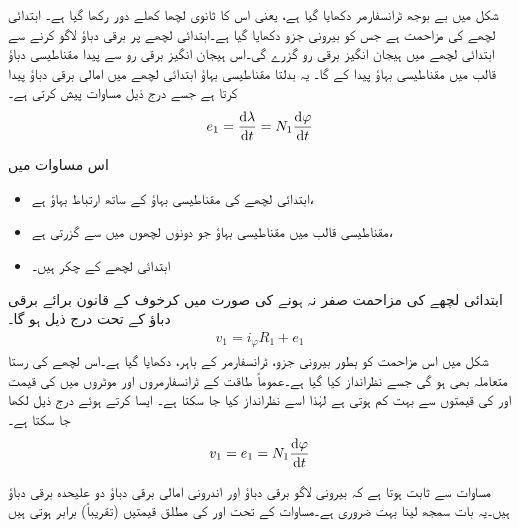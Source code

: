 شکل   میں بے بوجھ ٹرانسفارمر دکھایا گیا ہے، یعنی اس کا ثانوی لچھا  کھلے دور رکھا گیا ہے۔ ابتدائی لچھے کی مزاحمت  ہے جس کو بیرونی جزو دکھایا گیا ہے۔ابتدائی لچھے پر  برقی دباؤ لاگو کرنے سے ابتدائی لچھے میں ہیجان انگیز برقی رو  گزرے گی۔اس ہیجان انگیز برقی رو سے پیدا مقناطیسی دباؤ   قالب میں مقناطیسی بہاؤ   پیدا کے گا۔ یہ بدلتا مقناطیسی بہاؤ ابتدائی لچھے میں امالی برقی  دباؤ   پیدا کرتا ہے جسے درج ذیل مساوات پیش کرتی ہے۔
\begin{align}
e_1=\frac{\dif \lambda}{\dif t}=N_1 \frac{\dif \varphi}{\dif t}
\end{align}

 اس مساوات میں
\begin{itemize}
\item
{} ابتدائی لچھے کی مقناطیسی بہاؤ کے ساتھ ارتباط بہاؤ ہے،
\item
{} مقناطیسی قالب میں مقناطیسی بہاؤ جو دونوں لچھوں میں سے گزرتی ہے،
\item
{} ابتدائی لچھے کے چکر ہیں۔
\end{itemize}
%

ابتدائی لچھے کی مزاحمت  صفر نہ ہونے کی صورت میں کرخوف کے قانون برائے برقی دباؤ کے تحت درج ذیل ہو گا۔
\begin{align}\label{مساوات_ٹرانسفارمر_بیرونی_اندرونی_دباو_فرق}
v_1 = i_{\varphi} R_1+e_1
\end{align}
شکل  میں اس مزاحمت کو بطور بیرونی جزو، ٹرانسفارمر کے باہر، دکھایا گیا ہے۔اس لچھے کی رستا متعاملہ بھی ہو گی جسے نظرانداز کیا گیا ہے۔عموماً طاقت کے ٹرانسفارمروں اور موٹروں  میں  کی قیمت  اور  کی قیمتوں سے بہت کم ہوتی ہے لہٰذا اسے نظرانداز کیا جا سکتا ہے۔ ایسا کرتے ہوئے درج ذیل لکھا جا سکتا ہے۔
\begin{align}\label{مساوات_ٹرانسفارمر_بیرونی_اندرونی_دباو_تقریبا_برابر}
v_1 = e_1=N_1 \frac{\dif \varphi}{\dif t}
\end{align}

مساوات  سے  ثابت ہوتا ہے کہ بیرونی لاگو برقی دباؤ  اور اندرونی امالی برقی دباؤ  دو علیحدہ برقی دباؤ ہیں۔یہ بات سمجھ لینا بہت ضروری ہے۔مساوات  کے تحت  اور  کی مطلق قیمتیں  (تقریباً) برابر ہوتی ہیں

